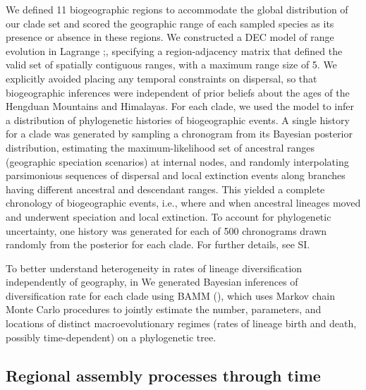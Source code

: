 We defined 11 biogeographic regions to accommodate the global distribution of our clade set and scored the geographic range of each sampled species as its presence or absence in these regions. We constructed a DEC model of range evolution in Lagrange \cite{Ree2005};\cite{Ree2008}, specifying a region-adjacency matrix that defined the valid set of spatially contiguous ranges, with a maximum range size of 5. We explicitly avoided placing any temporal constraints on dispersal, so that biogeographic inferences were independent of prior beliefs about the ages of the Hengduan Mountains and Himalayas. For each clade, we used the model to infer a distribution of phylogenetic histories of biogeographic events. A single history for a clade was generated by sampling a chronogram from its Bayesian posterior distribution, estimating the maximum-likelihood set of ancestral ranges (geographic speciation scenarios) at internal nodes, and randomly interpolating parsimonious sequences of dispersal and local extinction events along branches having different ancestral and descendant ranges. This yielded a complete chronology of biogeographic events, i.e., where and when ancestral lineages moved and underwent speciation and local extinction. To account for phylogenetic uncertainty, one history was generated for each of 500 chronograms drawn randomly from the posterior for each clade. For further details, see SI.

To better understand heterogeneity in rates of lineage diversification independently of geography, in We generated Bayesian inferences of diversification rate for each clade using BAMM (\cite{Rabosky2014}), which uses Markov chain Monte Carlo procedures to jointly estimate the number, parameters, and locations of distinct macroevolutionary regimes (rates of lineage birth and death, possibly time-dependent) on a phylogenetic tree.

\subsection{Regional assembly processes through time}

